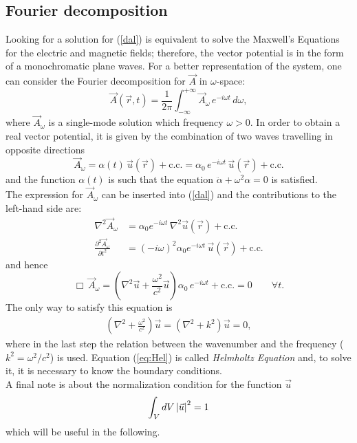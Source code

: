 \subsection{Fourier decomposition}
Looking for a solution for (\ref{dal}) is equivalent to solve the Maxwell's Equations for the electric and magnetic fields; therefore, the vector potential is in the form of a monochromatic plane waves. For a better representation of the system, one can consider the Fourier decomposition for $\vec{A}$ in $\omega$-space:
\begin{equation}
\vec{A}(\Vec{r},t)=\frac{1}{2\pi}\int_{-\infty}^{+\infty}{\vec{A}_{\omega}\, e^{-i\omega t}\, d\omega},
\end{equation}
where $\vec{A}_\omega$ is a single-mode solution which frequency $\omega >0$. In order to obtain a real vector potential, it is given by the combination of two waves travelling in opposite directions
\begin{equation}
    \vec{A}_\omega =\alpha(t) \, \Vec{u}(\vec{r})+\text{c.c.} = \alpha_{0} \, e^{-i\omega t} \, \Vec{u}(\vec{r})+ \text{c.c.} 
    \label{eq:Asm}
\end{equation}
and the function $\alpha(t)$ is such that the equation $\ddot{\alpha} + \omega^2 \alpha = 0$ is satisfied. \\
The expression for $\vec{A}_{\omega}$ can be inserted into (\ref{dal}) and the contributions to the left-hand side are: 
\begin{align*}
    \nabla^{2}\Vec{A}_{\omega}&=\alpha_{0}e^{-i\omega t} \, \nabla^{2}\Vec{u}(\Vec{r})+ \text{c.c.} \\
    \frac{\partial^{2}\Vec{A}_{\omega}}{\partial t^{2}}&=(-i\omega)^{2}\alpha_{0}e^{-i\omega t}\, \Vec{u}(\Vec{r})+\text{c.c.}
\end{align*}
and hence
\begin{equation}
    \Box\, {\Vec{A}_{\omega}}=  \left(\nabla^{2}\Vec{u}+\frac{\omega^{2}}{c^{2}}\Vec{u}\right)\alpha_{0}\, e^{-i\omega t}+\text{c.c.} = 0 \qquad \forall t.
\end{equation}
The only way to satisfy this equation is 
\begin{align}
    \left( \nabla^{2} + \frac{\omega^{2}}{c^{2}}\right) \Vec{u} = \left( \nabla^{2} + k^2\right) \Vec{u} = 0,
    \label{eq:Hel}
\end{align}
where in the last step the relation between the wavenumber and the frequency ($k^2 = \omega^2/c^2$) is used. Equation (\ref{eq:Hel}) is called \textit{Helmholtz Equation} and, to solve it, it is necessary to know the boundary conditions. \\
A final note is about the normalization condition for the function $\vec{u}$
\begin{equation}
    \int_{V}{dV \, \abs{\Vec{u}}^{2}}  = 1
    \label{eq:ortho}
\end{equation}
which will be useful in the following. 



